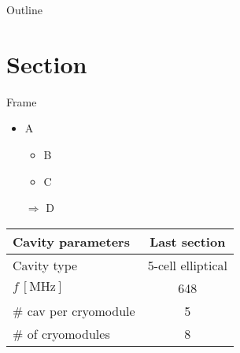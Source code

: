 


% 


\maketitle

\begin{frame}[noframenumbering]{Outline}
   \tableofcontents
\end{frame}

\section{Section}
\begin{frame}{Frame}
   \begin{itemize}
      \item A
            \begin{itemize}
               \item B
               \item C
            \end{itemize}
      \item[\( \Rightarrow \)] D
   \end{itemize}
   \begin{table}[hbtp]
      \centering
      \begin{tabular}{@{} l c @{}}
         \toprule
         Cavity parameters     & Last section      \\
         \midrule
         Cavity type           & 5-cell elliptical \\
         \( f\,[\si{\MHz}]\)   & \num{648}         \\
         \# cav per cryomodule & \num{5}           \\
         \# of cryomodules     & 8                 \\
         \bottomrule
      \end{tabular}
   \end{table}
\end{frame}





